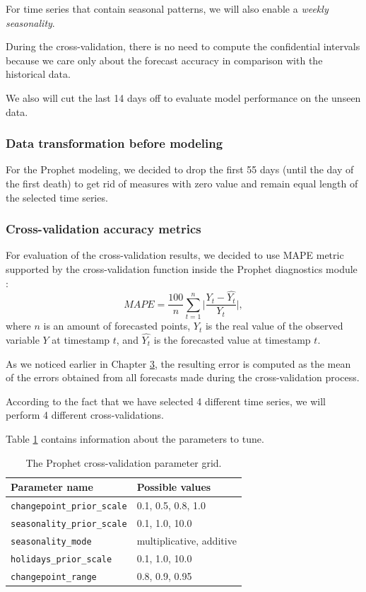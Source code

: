 For time series that contain seasonal patterns, we will also enable a \textit{weekly seasonality}. 

During the cross-validation, there is no need to compute the confidential intervals because we care only about the forecast accuracy in comparison with the historical data. 

We also will cut the last 14 days off to evaluate model performance on the unseen data.

\subsubsection{Data transformation before modeling}

For the Prophet modeling, we decided to drop the first 55 days (until the day of the first death) to get rid of measures with zero value and remain equal length of the selected time series.

\subsubsection{Cross-validation accuracy metrics}

For evaluation of the cross-validation results, we decided to use MAPE metric supported by the cross-validation function inside the Prophet diagnostics module \cite{ProphetDoc}: 
\begin{equation}
    MAPE = \frac{100}{n}\sum_{t=1}^{n}\Big|\frac{Y_t - \hat{Y_t}}{Y_t}\Big|,
\end{equation}    
where $n$ is an amount of forecasted points, $Y_t$ is the real value of the observed variable $Y$ at timestamp $t$, and $\hat{Y_t}$ is the forecasted value at timestamp $t$.

As we noticed earlier in Chapter \hyperlink{ch3}{3}, the resulting error is computed as the mean of the errors obtained from all forecasts made during the cross-validation process.  

According to the fact that we have selected 4 different time series, we will perform 4 different cross-validations.

Table \ref{tab:cross_val_grid} contains information about the parameters to tune.

\begin{table}[!ht]
    \centering
    \begin{tabular}{|p{6cm}||p{4cm}|}
    \hline
    Parameter name & Possible values\\
    \hline
    \verb|changepoint_prior_scale| & 0.1, 0.5, 0.8, 1.0\\
    \hline
    \verb|seasonality_prior_scale| & 0.1, 1.0, 10.0\\
    \hline
    \verb|seasonality_mode| & multiplicative, additive\\
    \hline
    \verb|holidays_prior_scale| & 0.1, 1.0, 10.0\\
    \hline
    \verb|changepoint_range| & 0.8, 0.9, 0.95\\
    \hline
\end{tabular}
    \caption{The Prophet cross-validation parameter grid.}
    \label{tab:cross_val_grid}
\end{table}

